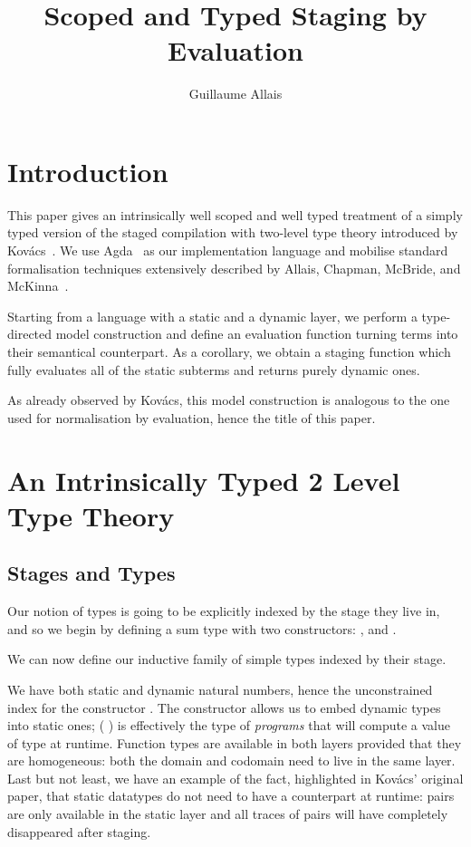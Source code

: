 \documentclass{article}
\title{Scoped and Typed Staging by Evaluation}
\author{Guillaume Allais}
\begin{document}
\maketitle

\section{Introduction}

This paper gives an intrinsically well scoped and well typed
treatment of a simply typed version of the staged compilation
with two-level type theory introduced by
Kov{\'{a}}cs~\cite{DBLP:journals/pacmpl/Kovacs22}.
%
We use Agda~\cite{DBLP:conf/afp/Norell08}
as our implementation language and
mobilise standard formalisation
techniques extensively described by Allais, Chapman,
McBride, and McKinna~\cite{DBLP:conf/cpp/Allais0MM17}.

Starting from a language with a static and a dynamic layer,
we perform a type-directed model construction
and define an evaluation function turning terms
into their semantical counterpart.
%
As a corollary, we obtain a staging function which
fully evaluates all of the static subterms and returns
purely dynamic ones.

As already observed by Kov{\'{a}}cs, this model construction
is analogous to the one used for normalisation by evaluation,
hence the title of this paper.

\section{An Intrinsically Typed 2 Level Type Theory}



\subsection{Stages and Types}

Our notion of types is going to be explicitly indexed by the
stage they live in, and so we begin by defining a sum
type  with two constructors: ,
and .


We can now define our inductive family of simple types indexed
by their stage.


We have both static and dynamic natural numbers,
hence the unconstrained index  for the
constructor .
%
The constructor  allows us to embed dynamic
types into static ones; ( ) is effectively
the type of \emph{programs} that will compute a value of
type  at runtime.
%
Function types are available in both layers provided that
they are homogeneous: both the domain and codomain need
to live in the same layer.
%
Last but not least, we have an example of the fact,
highlighted in Kov{\'{a}}cs' original paper, that static
datatypes do not need to have a counterpart at runtime:
pairs are only available in the static layer and all traces
of pairs will have completely disappeared after staging.
\end{document}
